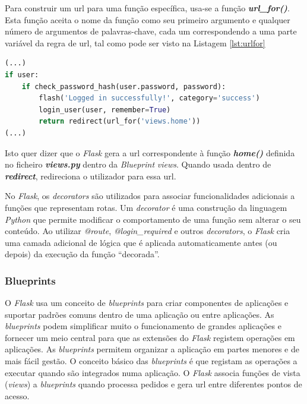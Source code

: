 Para construir um \acrshort{url} para uma função específica, usa-se a função \textit{\textbf{url\_for()}}. Esta função aceita o nome da função como seu primeiro argumento e qualquer número de argumentos de palavras-chave, cada um correspondendo a uma parte variável da regra de \acrshort{url}, tal como pode ser visto na Listagem \ref{lst:urlfor}

\begin{minipage}{0.9\linewidth}
	\begin{lstlisting}[language=Python, caption=Contrução de \textit{url}s - \textit{auth.py}, label=lst:urlfor]
(...)
if user:
    if check_password_hash(user.password, password):
        flash('Logged in successfully!', category='success')
        login_user(user, remember=True)
        return redirect(url_for('views.home'))
(...)
\end{lstlisting}
\end{minipage}

Isto quer dizer que o \textit{Flask} gera a \acrshort{url} correspondente à função \textit{\textbf{home()}} definida no ficheiro \textit{\textbf{views.py}} dentro da \textit{Blueprint} \textit{views}. Quando usada dentro de \textit{\textbf{redirect}}, redireciona o utilizador para essa \acrshort{url}.

No \textit{Flask}, os \textit{decorators} são utilizados para associar funcionalidades adicionais a funções que representam rotas. Um \textit{decorator} é uma construção da linguagem \textit{Python} que permite modificar o comportamento de uma função sem alterar o seu conteúdo. Ao utilizar \textit{@route}, \textit{@login\_required} e outros \textit{decorators}, o \textit{Flask} cria uma camada adicional de lógica que é aplicada automaticamente antes (ou depois) da execução da função ``decorada''.

\subsubsection{Blueprints}
O \textit{Flask} usa um conceito de \textit{blueprints} para criar componentes de aplicações e suportar padrões comuns dentro de uma aplicação ou entre aplicações. As \textit{blueprints} podem simplificar muito o funcionamento de grandes aplicações e fornecer um meio central para que as extensões do \textit{Flask} registem operações em aplicações. As \textit{blueprints} permitem organizar a aplicação em partes menores e de mais fácil gestão. O conceito básico das \textit{blueprints} é que registam as operações a executar quando são integrados numa aplicação. O \textit{Flask} associa funções de vista (\textit{views}) a \textit{blueprints} quando processa pedidos e gera \acrshort{url} entre diferentes pontos de acesso.

